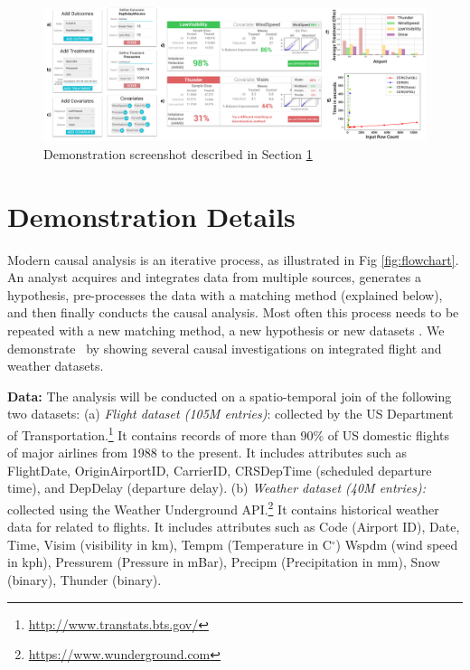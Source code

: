 
\begin{figure} \centering

\includegraphics[scale=0.155]{Figures/Demo-Tutorial.png}
\caption{Demonstration screenshot described in Section \ref{sec:dd}}
\label{sfig:demo-tutorial}
\end{figure}

\vspace{-.3cm}
\section{Demonstration Details}
\label{sec:dd}
Modern causal analysis is an iterative process, as  illustrated in Fig \ref{fig:flowchart}.
An analyst acquires and integrates data from multiple sources,
generates a hypothesis, pre-processes the data with a matching  method (explained below), and then finally
 conducts the causal analysis. Most often this process needs to be repeated with a new matching
  method, a new hypothesis or new datasets \cite{IacKinPor09}.
We demonstrate \GSQL\ by showing several causal investigations on integrated flight and weather datasets. 


    {\bf Data:} The analysis will be conducted on a spatio-temporal join of the following two datasets:
(a) {\it Flight dataset (105M entries)}: collected by the US
Department of Transportation.\footnote{\url{http://www.transtats.bts.gov/}} It contains
records of more than 90\% of US domestic flights of major airlines
from 1988 to the present. It includes attributes such as FlightDate, OriginAirportID,
CarrierID, CRSDepTime (scheduled departure time), and DepDelay (departure delay).
(b) {\it Weather dataset (40M entries):} collected using the Weather Underground API.\footnote{\url{https://www.wunderground.com}}
It contains historical weather data for related to flights. It includes attributes such as Code (Airport ID),
Date, Time,  Visim (visibility in km),
  Tempm (Temperature in C$^{\circ}$)
  Wspdm (wind speed in kph), Pressurem (Pressure in mBar), Precipm  (Precipitation in mm), Snow (binary), Thunder (binary).






